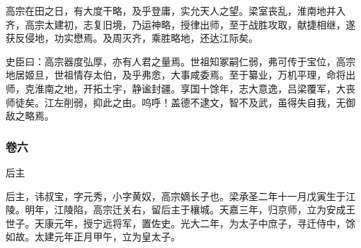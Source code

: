 \documentclass[]{article}
\begin{document}
高宗在田之日，有大度干略，及乎登庸，实允天人之望。梁室丧乱，淮南地并入齐，高宗太建初，志复旧境，乃运神略，授律出师，至于战胜攻取，献捷相继，遂获反侵地，功实懋焉。及周灭齐，乘胜略地，还达江际矣。

史臣曰：高宗器度弘厚，亦有人君之量焉。世祖知冢嗣仁弱，弗可传于宝位，高宗地居姬旦，世祖情存太伯，及乎弗悆，大事咸委焉。至于纂业，万机平理，命将出师，克淮南之地，开拓土宇，静谧封疆。享国十馀年，志大意逸，吕梁覆军，大丧师徒矣。江左削弱，抑此之由。呜呼！盖德不逮文，智不及武，虽得失自我，无御敌之略焉。

\hypertarget{header-n4251}{%
\subsubsection{卷六}\label{header-n4251}}

后主

后主，讳叔宝，字元秀，小字黄奴，高宗嫡长子也。梁承圣二年十一月戊寅生于江陵。明年，江陵陷，高宗迁关右，留后主于穰城。天嘉三年，归京师，立为安成王世子。天康元年，授宁远将军，置佐史。光大二年，为太子中庶子，寻迁侍中，馀如故。太建元年正月甲午，立为皇太子。
\end{document}
